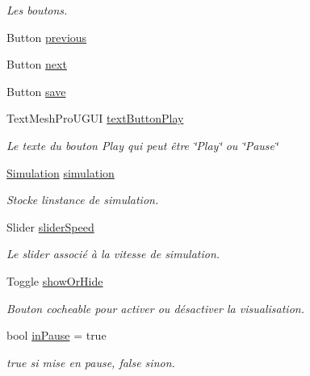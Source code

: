 \begin{DoxyCompactItemize}
\begin{DoxyCompactList}\small\item\em Les boutons. \end{DoxyCompactList}\item 
Button \mbox{\hyperlink{class_menu_visualization_u_i_a3f9110eee26214a3b05f68c10d878558}{previous}}
\item 
Button \mbox{\hyperlink{class_menu_visualization_u_i_a9a01852c63692dc3e56138a7d583b124}{next}}
\item 
Button \mbox{\hyperlink{class_menu_visualization_u_i_aca66441fb827fa1ce3402a0a3c0b9483}{save}}
\item 
Text\+Mesh\+Pro\+U\+G\+UI \mbox{\hyperlink{class_menu_visualization_u_i_aff6c8da4a2af320451a956a18e4e891b}{text\+Button\+Play}}
\begin{DoxyCompactList}\small\item\em Le texte du bouton Play qui peut être \char`\"{}\+Play\char`\"{} ou \char`\"{}\+Pause\char`\"{} \end{DoxyCompactList}\item 
\mbox{\hyperlink{class_simulation}{Simulation}} \mbox{\hyperlink{class_menu_visualization_u_i_afa6725a6bef7e1c90a66a28485a241b3}{simulation}}
\begin{DoxyCompactList}\small\item\em Stocke l\textquotesingle{}instance de simulation. \end{DoxyCompactList}\item 
Slider \mbox{\hyperlink{class_menu_visualization_u_i_a91d9a2a50167c5d57b7df5ad88cc48a9}{slider\+Speed}}
\begin{DoxyCompactList}\small\item\em Le slider associé à la vitesse de simulation. \end{DoxyCompactList}\item 
Toggle \mbox{\hyperlink{class_menu_visualization_u_i_a76465e77e095aa0edd97d7dba183402e}{show\+Or\+Hide}}
\begin{DoxyCompactList}\small\item\em Bouton cocheable pour activer ou désactiver la visualisation. \end{DoxyCompactList}\item 
bool \mbox{\hyperlink{class_menu_visualization_u_i_a401c5d14618bf08e1c50e20509d2b0e7}{in\+Pause}} = true
\begin{DoxyCompactList}\small\item\em true si mise en pause, false sinon. \end{DoxyCompactList}\item 

\end{DoxyCompactItemize}

